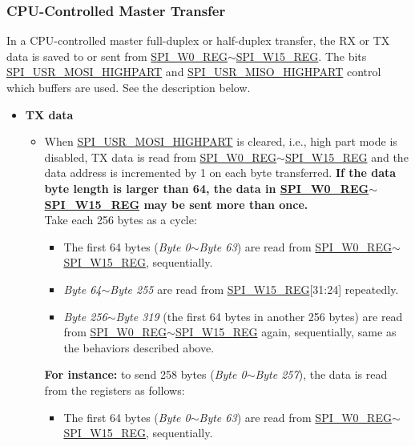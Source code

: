 \documentclass[main\_\_EN.tex]{subfiles}
\begin{document}
\subsubsection{CPU-Controlled Master Transfer} \label{sec:gp-spi-master-cpu}

In a CPU-controlled master full-duplex or half-duplex transfer, the RX or TX data is saved to or sent from \hyperref[regdesc:SPIW0REG]{SPI\_W0\_REG}$\sim$\hyperref[regdesc:SPIW15REG]{SPI\_W15\_REG}. The bits \hyperref[fielddesc:SPIUSRMOSIHIGHPART]{SPI\_USR\_MOSI\_HIGHPART} and \hyperref[fielddesc:SPIUSRMISOHIGHPART]{SPI\_USR\_MISO\_HIGHPART} control which buffers are used. See the description below. 

\begin{itemize}
    \item \textbf{TX data}
    \begin{itemize}
        \item When \hyperref[fielddesc:SPIUSRMOSIHIGHPART]{SPI\_USR\_MOSI\_HIGHPART} is cleared, i.e., high part mode is disabled, TX data is read from \hyperref[regdesc:SPIW0REG]{SPI\_W0\_REG}$\sim$\hyperref[regdesc:SPIW15REG]{SPI\_W15\_REG} and the data address is incremented by 1 on each byte transferred. \textbf{If the data byte length is larger than 64, the data in \hyperref[regdesc:SPIW0REG]{SPI\_W0\_REG}$\sim$\hyperref[regdesc:SPIW15REG]{SPI\_W15\_REG} may be sent more than once.} \\
        Take each 256 bytes as a cycle:
        \begin{itemize}
            \item The first 64 bytes (\emph{Byte 0}$\sim$\emph{Byte 63}) are read from \hyperref[regdesc:SPIW0REG]{SPI\_W0\_REG}$\sim$\hyperref[regdesc:SPIW15REG]{SPI\_W15\_REG}, sequentially.
            \item \emph{Byte 64}$\sim$\emph{Byte 255} are read from \hyperref[regdesc:SPIW15REG]{SPI\_W15\_REG}[31:24] repeatedly. 
            \item \emph{Byte 256}$\sim$\emph{Byte 319} (the first 64 bytes in another 256 bytes) are read from \hyperref[regdesc:SPIW0REG]{SPI\_W0\_REG}$\sim$\hyperref[regdesc:SPIW15REG]{SPI\_W15\_REG} again, sequentially, same as the behaviors described above.
        \end{itemize}
        \textbf{For instance:} to send 258 bytes (\emph{Byte 0}$\sim$\emph{Byte 257}), the data is read from the registers as follows:
        \begin{itemize}
            \item The first 64 bytes (\emph{Byte 0}$\sim$\emph{Byte 63}) are read from \hyperref[regdesc:SPIW0REG]{SPI\_W0\_REG}$\sim$\hyperref[regdesc:SPIW15REG]{SPI\_W15\_REG}, sequentially.

\end{itemize}
\end{itemize}
\end{itemize}
\end{document}

